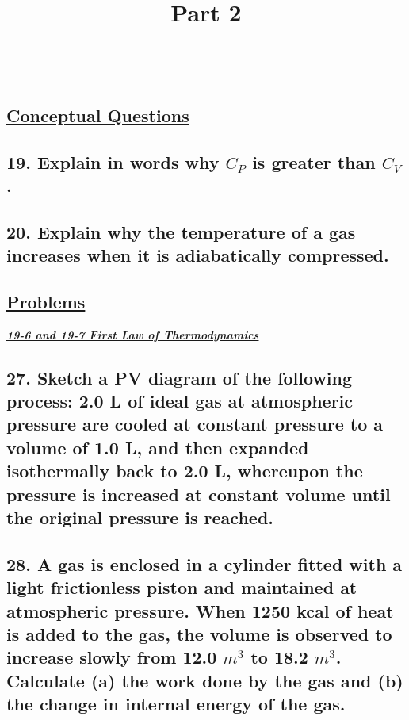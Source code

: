 \documentclass{article}
\title{
    \vspace{2in}
    \textmd{\textbf{\hmwkTitle}} \\
    \textmd{\textbf{Part 2}} \\
    \vspace{0.5in}
    \textmd{\textbf{\hmwkClass}}\\
    \vspace{4in}
}
\author{\hmwkAuthorName}
\date{}
\begin{document}
\maketitle
\clearpage\shipout\null
\begin{center}
    \section*{\textbf{\underline {Conceptual Questions}}}
\end{center}
    \subsection*{19. Explain in words why $C_P$ is greater than $C_V$.}
    \vspace{4in}
    \subsection*{20. Explain why the temperature of a gas increases when it is adiabatically compressed.}
\newpage
\begin{center}
    \section*{\textbf{\underline {Problems}}}
\end{center}
\noindent \large{\textbf{\textit{\underline{19-6 and 19-7  First Law of Thermodynamics}}}} \\
    \subsection*{27. Sketch a PV diagram of the following process: 2.0 L of ideal gas at atmospheric pressure are cooled at constant pressure to a volume of 1.0 L, and then expanded isothermally back to 2.0 L, whereupon the pressure is increased at constant volume until the original pressure is reached.}
    \vspace{4in}
    \subsection*{28. A gas is enclosed in a cylinder fitted with a light frictionless piston and maintained at atmospheric pressure. When 1250 kcal of heat is added to the gas, the volume is observed to increase slowly from 12.0 $m^3$ to 18.2 $m^3$. Calculate (a) the work done by the gas and (b) the change in internal energy of the gas.}
    \newpage
\end{document}
